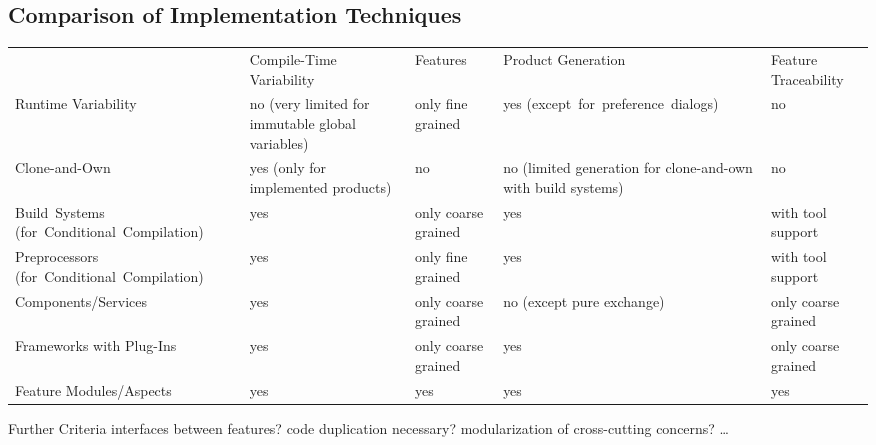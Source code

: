 \subsection{Comparison of Implementation Techniques}
\begin{frame}[label=ComparisonOfImplementationTechniques,fragile]{\myframetitle}
	\centering
	\renewcommand{\arraystretch}{1.2}
	\newcommand{\myexception}[1]{\tiny{}(#1)}
	\begin{tabular}{p{32mm}p{32mm}p{14mm}p{27mm}p{14mm}}
		 & Compile-Time Variability & Features & Product Generation & Feature \mbox{Traceability} \pause\\\rowcolor{gray!50}
		Runtime Variability & no \myexception{very limited for immutable global variables} & only fine grained & yes \mbox{\myexception{except for preference dialogs}} & no \pause\\
		Clone-and-Own & yes \linebreak\myexception{only for implemented products} & no & no \myexception{limited generation for clone-and-own with build systems} & no \pause\\\rowcolor{gray!50}
		\mbox{Build Systems} \mbox{\myexception{for Conditional Compilation}} & yes & only coarse grained & yes & with tool support \pause\\
		Preprocessors \mbox{\myexception{for Conditional Compilation}} & yes & only fine grained & yes & with tool support \pause\\\rowcolor{gray!50}
		Components/Services & yes & only coarse grained & no \linebreak\myexception{except pure exchange} & only coarse grained \pause\\
		Frameworks with Plug-Ins & yes & only coarse grained & yes & only coarse grained \pause\\\rowcolor{gray!50}
		Feature Modules/Aspects & yes & yes & yes & yes \pause\\
	\end{tabular}
	\begin{note}{Further Criteria}
		interfaces between features? code duplication necessary? modularization of cross-cutting concerns? \ldots
	\end{note}
\end{frame}

